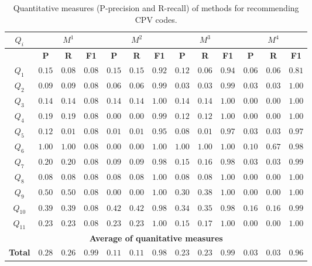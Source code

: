 \begin{table}[!htb]
\renewcommand{\arraystretch}{1.3}
\begin{center}
\scriptsize
\begin{tabular}{|c||c|c|c||c|c|c||c|c|c||c|c|c|}
\hline
 \textbf{$Q_i$}&\multicolumn{3}{|c||}{$M^{1}$} & \multicolumn{3}{|c||}{$M^{2}$}& \multicolumn{3}{|c||}{$M^{3}$} & \multicolumn{3}{|c|}{$M^{4}$} \\ \hline
	  &\textbf{P} & \textbf{R} & \textbf{F1} & \textbf{P} & \textbf{R} & \textbf{F1} & \textbf{P} & \textbf{R} & \textbf{F1} & \textbf{P} & \textbf{R} & \textbf{F1}  \\ \hline \hline
$Q_1$  	  &$0.15$ & $0.08$ & $0.08$ &		$0.15$ & $0.15$ & $0.92$ &	$0.12$ & $0.06$ & $0.94$ &	$0.06$ & $0.06$ & $0.81$ \\ \hline
$Q_2$  	  &$0.09$ & $0.09$ & $0.08$ & 		$0.06$ & $0.06$ & $0.99$ & 	$0.03$ & $0.03$ & $0.99$ & 	$0.03$ & $0.03$ & $1.00$ \\ \hline
$Q_3$  	  &$0.14$ & $0.14$ & $0.08$ & 		$0.14$ & $0.14$ & $1.00$ & 	$0.14$ & $0.14$ & $1.00$ & 	$0.00$ & $0.00$ & $1.00$ \\ \hline
$Q_4$  	  &$0.19$ & $0.19$ & $0.08$ &		$0.00$ & $0.00$ & $0.99$ & 	$0.12$ & $0.12$ & $1.00$ & 	$0.00$ & $0.00$ & $1.00$ \\ \hline
$Q_5$  	  &$0.12$ & $0.01$ & $0.08$ & 		$0.01$ & $0.01$ & $0.95$ & 	$0.08$ & $0.01$ & $0.97$ & 	$0.03$ & $0.03$ & $0.97$ \\ \hline
$Q_6$  	  &$1.00$ & $1.00$ & $0.08$ & 		$0.00$ & $0.00$ & $1.00$ & 	$1.00$ & $1.00$ & $1.00$ & 	$0.10$ & $0.67$ & $0.98$ \\ \hline
$Q_7$  	  &$0.20$ & $0.20$ & $0.08$ & 		$0.09$ & $0.09$ & $0.98$ & 	$0.15$ & $0.16$ & $0.98$ & 	$0.03$ & $0.03$ & $0.99$ \\ \hline
$Q_8$  	  &$0.08$ & $0.08$ & $0.08$ & 		$0.08$ & $0.08$ & $1.00$ & 	$0.08$ & $0.08$ & $1.00$ & 	$0.00$ & $0.00$ & $1.00$ \\ \hline
$Q_9$  	  &$0.50$ & $0.50$ & $0.08$ & 		$0.00$ & $0.00$ & $1.00$ & 	$0.30$ & $0.38$ & $1.00$ & 	$0.00$ & $0.00$ & $1.00$ \\ \hline
$Q_{10}$  &$0.39$ & $0.39$ & $0.08$ & 		$0.42$ & $0.42$ & $0.98$ & 	$0.34$ & $0.35$ & $0.98$ & 	$0.16$ & $0.16$ & $0.99$ \\ \hline
$Q_{11}$  &$0.23$ & $0.23$ & $0.08$ & 		$0.23$ & $0.23$ & $1.00$ & 	$0.15$ & $0.17$ & $1.00$ & 	$0.00$ & $0.00$ & $1.00$ \\ \hline
\multicolumn{13}{|c|}{\textbf{Average of quanitative measures}} \\ \hline
\textbf{Total}  &$0.28$ & $0.26$ & $0.99$ & 	$0.11$ & $0.11$ & $0.98$ &  	$0.23$ & $0.23$ & $0.99$ &  	$0.03$ & $0.03$ & $0.96$ \\ \hline
\hline
 \end{tabular}
\caption{Quantitative measures (P-precision and R-recall) of methods for recommending CPV codes.}\label{table:queries-ir-results}
  \end{center}
\end{table} 




